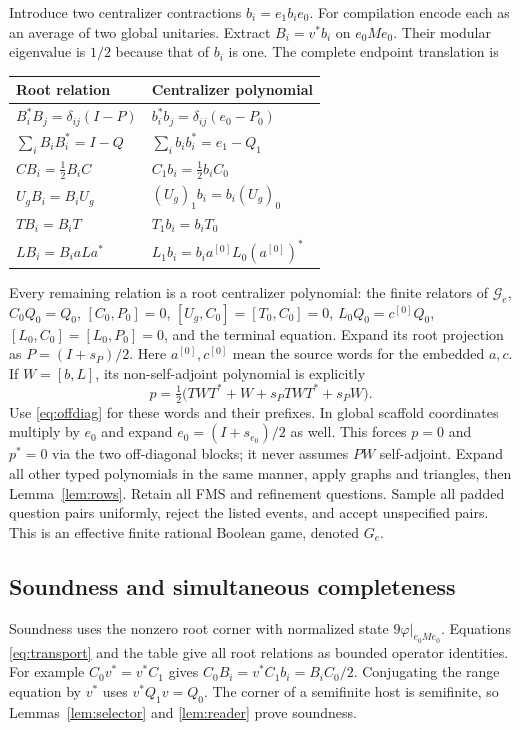 Introduce two centralizer contractions $b_i=e_1b_ie_0$.
For compilation encode each as an average of two global unitaries.
Extract $B_i=v^*b_i$ on $e_0Me_0$.
Their modular eigenvalue is $1/2$ because that of $b_i$ is one.
The complete endpoint translation is
\begin{center}\small
\begin{tabular}{@{}ll@{}}
\toprule Root relation & Centralizer polynomial\\\midrule
$B_i^*B_j=\delta_{ij}(I-P)$
& $b_i^*b_j=\delta_{ij}(e_0-P_0)$\\
$\sum_iB_iB_i^*=I-Q$ & $\sum_i b_ib_i^*=e_1-Q_1$\\
$CB_i=\frac12B_iC$ & $C_1b_i=\frac12b_iC_0$\\
$U_gB_i=B_iU_g$ & $(U_g)_1b_i=b_i(U_g)_0$\\
$TB_i=B_iT$ & $T_1b_i=b_iT_0$\\
$LB_i=B_i aLa^*$ & $L_1b_i=b_i a^{[0]}L_0(a^{[0]})^*$\\
\bottomrule
\end{tabular}
\end{center}
Every remaining relation is a root centralizer polynomial:
the finite relators of $\mathcal G_e$, $C_0Q_0=Q_0$, $[C_0,P_0]=0$,
$[U_g,C_0]=[T_0,C_0]=0$,
$L_0Q_0=c^{[0]}Q_0$, $[L_0,C_0]=[L_0,P_0]=0$,
and the terminal equation.
Expand its root projection as $P=(I+s_P)/2$.
Here $a^{[0]},c^{[0]}$ mean the source words for the embedded $a,c$. If $W=[b,L]$, its non-self-adjoint polynomial is explicitly
\[
 p=\tfrac12\bigl(TWT^*+W+s_PTWT^*+s_PW\bigr).
\]
Use \eqref{eq:offdiag} for these words and their prefixes.
In global scaffold coordinates multiply by $e_0$ and expand
$e_0=(I+s_{e_0})/2$ as well. This forces $p=0$ and $p^*=0$ via
the two off-diagonal blocks; it never assumes $PW$ self-adjoint.
Expand all other typed polynomials in the same manner, apply
graphs and triangles, then Lemma~\ref{lem:rows}. Retain all FMS and
refinement questions. Sample all padded question pairs uniformly,
reject the listed events, and accept unspecified pairs.
This is an effective finite rational Boolean game, denoted $G_e$.

\subsection{Soundness and simultaneous completeness}
Soundness uses the nonzero root corner with normalized state
$9\varphi|_{e_0Me_0}$. Equations \eqref{eq:transport} and the table
give all root relations as bounded operator identities.
For example $C_0v^*=v^*C_1$ gives
$C_0B_i=v^*C_1b_i=B_iC_0/2$.
Conjugating the range equation by $v^*$ uses $v^*Q_1v=Q_0$.
The corner of a semifinite host is semifinite, so
Lemmas~\ref{lem:selector} and \ref{lem:reader} prove soundness.

